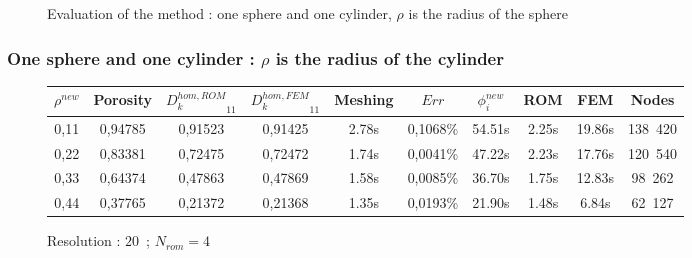 \begin{figure}[H]%
%
\begin{table}[H]
\begin{center}
%
%
\qquad
{}%
%
\end{center}
\end{table}
%
\caption{Evaluation of the method : one sphere and one cylinder, $\rho$ is the radius of the sphere}
\end{figure}

\subsubsection{One sphere and one cylinder : $\rho$ is the radius of the cylinder}

\begin{figure}[H]%
%
\begin{center}
\begin{tabular}{|c|c||c|c||c|c||c|c||c||c|}
\hline
\rowcolor{lightgray} $\rho^{new}$&Porosity&${D_k^{hom,ROM}}_{11}$&${D_k^{hom,FEM}}_{11}$&Meshing&$Err$&$\phi_i^{new}$&ROM&FEM&Nodes\\
\hline
0,11&0,94785&0,91523&0,91425&2.78s&0,1068\%&54.51s&2.25s&19.86s&138\ 420\\
\hline
0,22&0,83381&0,72475&0,72472&1.74s&0,0041\%&47.22s&2.23s&17.76s&120\ 540\\
\hline
0,33&0,64374&0,47863&0,47869&1.58s&0,0085\%&36.70s&1.75s&12.83s&98\ 262\\
\hline
0,44&0,37765&0,21372&0,21368&1.35s&0,0193\%&21.90s&1.48s&6.84s&62\ 127\\
\hline
\end{tabular}
\end{center}
\caption{Resolution : $20$\ ; $N_{rom}=4$}
%
\end{figure}

